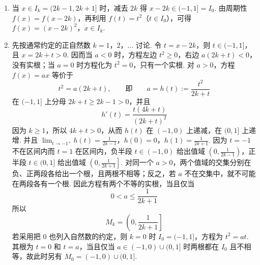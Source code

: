 \begin{solution}
\begin{enumerate}
\item 当 \(x\in I_k=(2k-1,2k+1]\) 时，减去 \(2k\) 得 \(x-2k\in(-1,1]=I_0\). 由周期性 \(f(x)=f(x-2k)\)，再利用 \(f(t)=t^2\)（\(t\in I_0\)），可得
\(f(x)=(x-2k)^2\)，\(x\in I_k\).

\item 先按通常约定的正自然数 \(k=1\)，\(2\)，\(\ldots\) 讨论. 令 \(t=x-2k\)，则 \(t\in(-1,1]\)，且 \(x=2k+t>0\). 因而当 \(a<0\) 时，方程左边 \(t^2\geqslant0\)，右边 \(a(2k+t)<0\)，没有实根；当 \(a=0\) 时方程化为 \(t^2=0\)，只有一个实根. 对 \(a>0\)，方程 \(f(x)=ax\) 等价于
\[
t^2=a(2k+t),\qquad\text{即}\qquad a=h(t):=\frac{t^2}{2k+t}
\]
在 \((-1,1]\) 上分母 \(2k+t\geqslant2k-1>0\)，并且
\[
h'(t)=\frac{t(4k+t)}{(2k+t)^2}
\]
因为 \(k\geqslant1\)，所以 \(4k+t>0\)，从而 \(h(t)\) 在 \((-1,0)\) 上递减，在 \((0,1]\) 上递增. 并且
\(\lim_{t\to-1^+}h(t)=\frac{1}{2k-1}\)，\(h(0)=0\)，\(h(1)=\frac{1}{2k+1}\).
因为 \(t=-1\) 不在区间内而 \(t=1\) 在区间内，负半段 \(t\in(-1,0)\) 给出值域 \(\left(0,\frac{1}{2k-1}\right)\)，正半段 \(t\in(0,1]\) 给出值域 \(\left(0,\frac{1}{2k+1}\right]\). 对同一个 \(a>0\)，两个值域的交集分别在负、正两段各给出一个根，且两根不相等；反之，若 \(a\) 不在交集中，就不可能在两段各有一个根. 因此方程有两个不等的实根，当且仅当
\[
0<a\leqslant\frac{1}{2k+1}
\]
所以
\[
M_k=\left(0,\frac{1}{2k+1}\right]
\]
若采用把 \(0\) 也列入自然数的约定，则 \(k=0\) 时 \(I_0=(-1,1]\)，方程为 \(t^2=at\). 其根为 \(t=0\) 和 \(t=a\)，当且仅当 \(a\in(-1,0)\cup(0,1]\) 时两根都在 \(I_0\) 且不相等，故此时另有 \(M_0=(-1,0)\cup(0,1]\).
\end{enumerate}
\end{solution}

